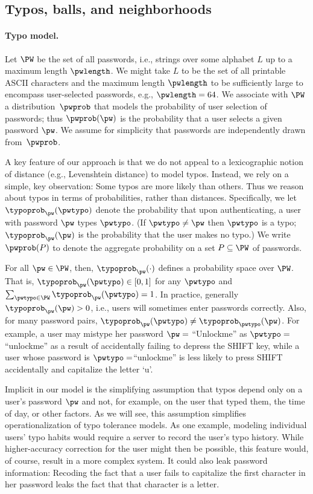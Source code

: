 \subsection{Typos, balls, and neighborhoods}
\paragraph{Typo model.} Let $\PW$ be the set of all passwords, i.e., strings
over some alphabet $L$ up to a maximum length $\pwlength$. We might take
$L$ to be the set of all printable ASCII characters and the maximum length $\pwlength$ to be
sufficiently large to encompass user-selected passwords, e.g., $\pwlength = 64$. We associate with $\PW$ a
distribution~$\pwprob$ that models the probability of user selection of
passwords; thus $\pwprob(\pw)$ is the probability that a user selects a given password $\pw$. We assume for simplicity that passwords are independently drawn from~$\pwprob$. 

A key feature of our approach is that we do not appeal to a lexicographic notion of distance (e.g., Levenshtein distance) to model typos. Instead, we rely on a simple, key observation: Some typos are more likely than others. Thus we reason about typos in terms of probabilities, rather than distances. Specifically, we let $\typoprob_{\pw}(\pwtypo)$ denote the probability that upon authenticating, a user with password $\pw$ types $\pwtypo$. (If $\pwtypo \neq \pw$ then $\pwtypo$ is a typo; $\typoprob_{\pw}(\pw)$ is the probability that the user makes no typo.) We write $\pwprob(P)$ to denote the aggregate probability on a set $P \subseteq \PW$ of passwords.

For all $\pw \in \PW$, then, $\typoprob_\pw(\cdot)$  defines a probability space
over $\PW$. That is, $\typoprob_\pw(\pwtypo) \in [0,1]$ for any $\pwtypo$ and 
$\sum_{\pwtypo \in \PW} \typoprob_{\pw}(\pwtypo) = 1$. In practice, generally $\typoprob_\pw(\pw) > 0$, i.e., users will sometimes enter passwords correctly. Also, for many password pairs, $\typoprob_{\pw}(\pwtypo) \neq \typoprob_{\pwtypo}(\pw)$. For example, a user may mistype her password $\pw =$ ``Unlockme'' as $\pwtypo =$``unlockme'' as a result of accidentally failing to depress the SHIFT key, while a user whose password is $\pwtypo =$``unlockme'' is less likely to press SHIFT accidentally and capitalize the letter `u'.

Implicit in our model is the simplifying assumption that typos depend only on a user's password $\pw$ and
not, for example, on the user that typed them, the time of day, or other factors.
As we will see, this assumption simplifies operationalization of typo
tolerance models. As one example, modeling individual users' typo habits would require a server to record the user's typo history.
While higher-accuracy correction for the user might then be possible, this feature would, of course, result in a more complex system. It could also leak password information: Recoding the fact that a user fails to capitalize the first character in her password leaks the fact that that character is a letter.

